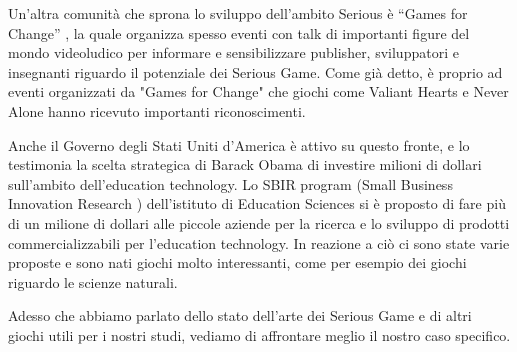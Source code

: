 Un'altra comunità che sprona lo sviluppo dell'ambito Serious è ``Games for Change'' \cite{gamesforchange}, la quale organizza spesso eventi con talk di importanti figure del mondo videoludico per informare e sensibilizzare publisher, sviluppatori e insegnanti riguardo il potenziale dei Serious Game. Come già detto, è proprio ad eventi organizzati da "Games for Change" che giochi come Valiant Hearts e Never Alone hanno ricevuto importanti riconoscimenti.

Anche il Governo degli Stati Uniti d'America è attivo su questo fronte, e lo testimonia la scelta strategica di Barack Obama di investire milioni di dollari sull'ambito dell'education technology. Lo SBIR program (Small Business Innovation Research \cite{sbirprogram}) dell'istituto di Education Sciences si è proposto di fare più di un milione di dollari alle piccole aziende per la ricerca e lo sviluppo di prodotti commercializzabili per l'education technology. In reazione a ciò ci sono state varie proposte e sono nati giochi molto interessanti, come per esempio dei giochi riguardo le scienze naturali.

Adesso che abbiamo parlato dello stato dell'arte dei Serious Game e di altri giochi utili per i nostri studi, vediamo di affrontare meglio il nostro caso specifico.

\newpage
